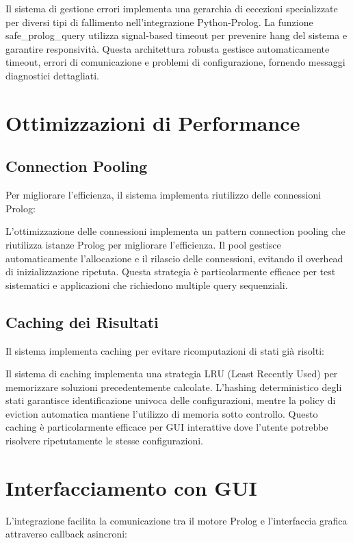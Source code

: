 \documentclass[12pt,a4paper]{report}
\theoremstyle{definition}
\begin{document}
Il sistema di gestione errori implementa una gerarchia di eccezioni specializzate per diversi tipi di fallimento nell'integrazione Python-Prolog. La funzione safe\_prolog\_query utilizza signal-based timeout per prevenire hang del sistema e garantire responsività. Questa architettura robusta gestisce automaticamente timeout, errori di comunicazione e problemi di configurazione, fornendo messaggi diagnostici dettagliati.

\section{Ottimizzazioni di Performance}

\subsection{Connection Pooling}

Per migliorare l'efficienza, il sistema implementa riutilizzo delle connessioni Prolog:

L'ottimizzazione delle connessioni implementa un pattern connection pooling che riutilizza istanze Prolog per migliorare l'efficienza. Il pool gestisce automaticamente l'allocazione e il rilascio delle connessioni, evitando il overhead di inizializzazione ripetuta. Questa strategia è particolarmente efficace per test sistematici e applicazioni che richiedono multiple query sequenziali.

\subsection{Caching dei Risultati}

Il sistema implementa caching per evitare ricomputazioni di stati già risolti:

Il sistema di caching implementa una strategia LRU (Least Recently Used) per memorizzare soluzioni precedentemente calcolate. L'hashing deterministico degli stati garantisce identificazione univoca delle configurazioni, mentre la policy di eviction automatica mantiene l'utilizzo di memoria sotto controllo. Questo caching è particolarmente efficace per GUI interattive dove l'utente potrebbe risolvere ripetutamente le stesse configurazioni.

\section{Interfacciamento con GUI}

L'integrazione facilita la comunicazione tra il motore Prolog e l'interfaccia grafica attraverso callback asincroni:
\end{document}
